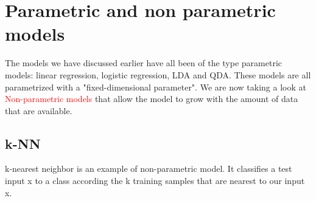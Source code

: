 \section{Parametric and non parametric models}
The models we have discussed earlier have all been of the type parametric models: linear regression, logistic regression, LDA and QDA. These models are all parametrized with a "fixed-dimensional parameter". We are now taking a look at \textcolor{red}{Non-parametric models} that allow the model to grow with the amount of data that are available. 

\subsection{k-\textbf{NN}}
k-nearest neighbor is an example of non-parametric model. It classifies a test input x to a class according the k training samples that are nearest to our input x. 






